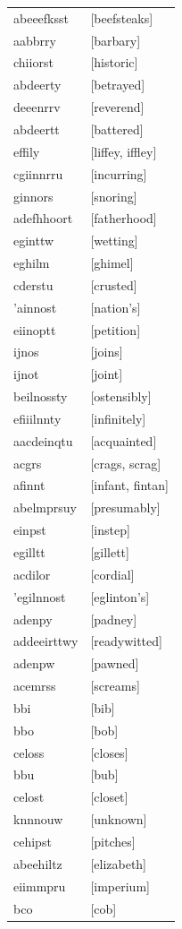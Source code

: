 \documentclass{article}
\begin{document}
\begin{tabular}{ll}
abeeefksst & [beefsteaks] \\
aabbrry & [barbary] \\
chiiorst & [historic] \\
abdeerty & [betrayed] \\
deeenrrv & [reverend] \\
abdeertt & [battered] \\
effily & [liffey, iffley] \\
cgiinnrru & [incurring] \\
ginnors & [snoring] \\
adefhhoort & [fatherhood] \\
eginttw & [wetting] \\
eghilm & [ghimel] \\
cderstu & [crusted] \\
'ainnost & [nation's] \\
eiinoptt & [petition] \\
ijnos & [joins] \\
ijnot & [joint] \\
beilnossty & [ostensibly] \\
efiiilnnty & [infinitely] \\
aacdeinqtu & [acquainted] \\
acgrs & [crags, scrag] \\
afinnt & [infant, fintan] \\
abelmprsuy & [presumably] \\
einpst & [instep] \\
egilltt & [gillett] \\
acdilor & [cordial] \\
'egilnnost & [eglinton's] \\
adenpy & [padney] \\
addeeirttwy & [readywitted] \\
adenpw & [pawned] \\
acemrss & [screams] \\
bbi & [bib] \\
bbo & [bob] \\
celoss & [closes] \\
bbu & [bub] \\
celost & [closet] \\
knnnouw & [unknown] \\
cehipst & [pitches] \\
abeehiltz & [elizabeth] \\
eiimmpru & [imperium] \\
bco & [cob] \\

\end{tabular}
\end{document}
